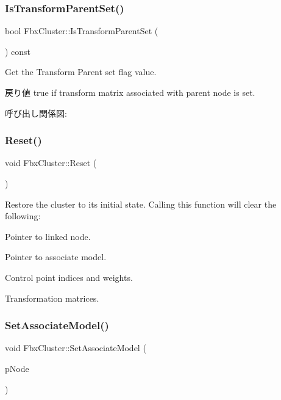 \mbox{\label{class_fbx_cluster_a1a9904707814b3a1fea61f4c35152fa5}} 
\subsubsection{\texorpdfstring{Is\+Transform\+Parent\+Set()}{IsTransformParentSet()}}
{\footnotesize\ttfamily bool Fbx\+Cluster\+::\+Is\+Transform\+Parent\+Set (\begin{DoxyParamCaption}{ }\end{DoxyParamCaption}) const}

Get the Transform Parent set flag value. \begin{DoxyReturn}{戻り値}
{\ttfamily true} if transform matrix associated with parent node is set. 
\end{DoxyReturn}
呼び出し関係図\+:
\mbox{\label{class_fbx_cluster_a6e12a1e6e2d6d8a05ddee9f280827cfc}} 
\subsubsection{\texorpdfstring{Reset()}{Reset()}}
{\footnotesize\ttfamily void Fbx\+Cluster\+::\+Reset (\begin{DoxyParamCaption}{ }\end{DoxyParamCaption})}

Restore the cluster to its initial state. Calling this function will clear the following\+: \begin{DoxyItemize}
\item Pointer to linked node. \item Pointer to associate model. \item Control point indices and weights. \item Transformation matrices. \end{DoxyItemize}
\mbox{\label{class_fbx_cluster_a561e81f78f469d7579879f0f27c9c6de}} 
\subsubsection{\texorpdfstring{Set\+Associate\+Model()}{SetAssociateModel()}}
{\footnotesize\ttfamily void Fbx\+Cluster\+::\+Set\+Associate\+Model (\begin{DoxyParamCaption}\item[{\hyperlink{class_fbx_node}{Fbx\+Node} $\ast$}]{p\+Node }\end{DoxyParamCaption})}

